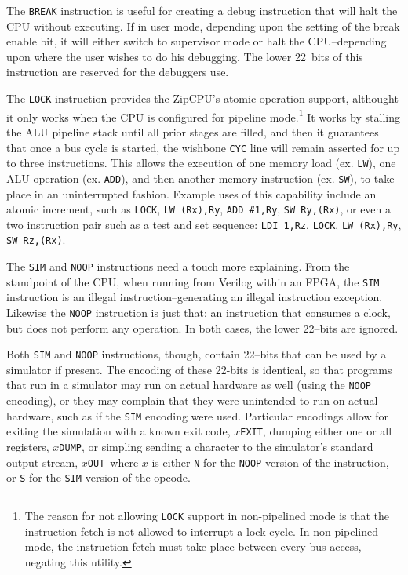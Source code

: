 \documentclass{gqtekspec}
\begin{document}
The {\tt BREAK} instruction is useful for creating a debug instruction that
will halt the CPU without executing.  If in user mode, depending upon the
setting of the break enable bit, it will either switch to supervisor mode or
halt the CPU--depending upon where the user wishes to do his debugging.  The
lower 22~bits of this instruction are reserved for the debuggers use.

The {\tt LOCK} instruction provides the ZipCPU's atomic operation support, 
althought it only works when the CPU is configured for pipeline
mode.\footnote{The reason for not allowing {\tt LOCK} support in
non-pipelined mode is that the instruction fetch is not allowed to interrupt
a lock cycle.  In non-pipelined mode, the instruction fetch must take place
between every bus access, negating this utility.}  It works by stalling the
ALU pipeline stack until all prior stages are filled, and then it guarantees
that once a bus cycle is started, the wishbone {\tt CYC} line will remain
asserted for up to three instructions.  This allows the execution of one
memory load (ex. {\tt LW}), one ALU operation (ex. {\tt ADD}), and then
another memory instruction (ex. {\tt SW}), to take place in an uninterrupted
fashion.  Example uses of this capability include an atomic increment, such
as {\tt LOCK}, {\tt LW (Rx),Ry}, {\tt ADD \#1,Ry}, {\tt SW Ry,(Rx)}, or even
a two instruction pair such as a test and set sequence: {\tt LDI 1,Rz},
{\tt LOCK}, {\tt LW (Rx),Ry}, {\tt SW Rz,(Rx)}.

The {\tt SIM} and {\tt NOOP} instructions need a touch more explaining.
From the standpoint of the CPU, when running from Verilog within an FPGA,
the {\tt SIM} instruction is an illegal instruction--generating an illegal
instruction exception.  Likewise the {\tt NOOP} instruction is just that:
an instruction that consumes a clock, but does not perform any operation.
In both cases, the lower 22--bits are ignored.

Both {\tt SIM} and {\tt NOOP} instructions, though, contain 22--bits that can
be used by a simulator if present.  The encoding of these 22-bits is identical,
so that programs that run in a simulator may run on actual hardware as well
(using the {\tt NOOP} encoding), or they may complain that they were unintended
to run on actual hardware, such as if the {\tt SIM} encoding were used.
Particular encodings allow for exiting the simulation with a known exit
code, {\tt $x$EXIT}, dumping either one or all registers, {\tt $x$DUMP}, 
or simpling sending a character to the simulator's standard output stream,
{\tt $x$OUT}--where $x$ is either {\tt N} for the {\tt NOOP} version of the
instruction, or {\tt S} for the {\tt SIM} version of the opcode.
\end{document}
